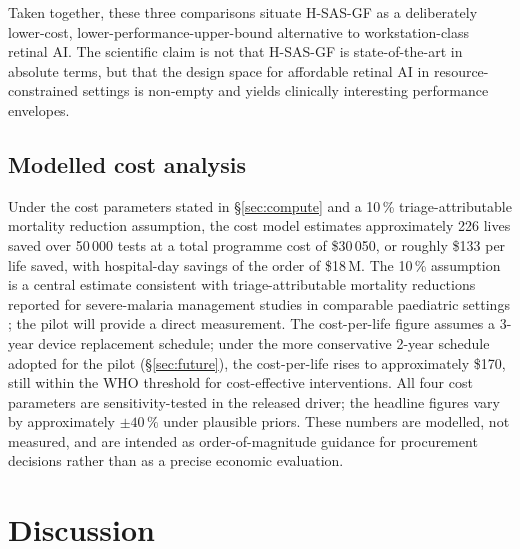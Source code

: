 \documentclass[twocolumn,10pt]{article}
\begin{document}
Taken together, these three comparisons situate H-SAS-GF as a
deliberately lower-cost, lower-performance-upper-bound alternative
to workstation-class retinal AI. The scientific claim is not that
H-SAS-GF is state-of-the-art in absolute terms, but that the
design space for affordable retinal AI in resource-constrained
settings is non-empty and yields clinically interesting
performance envelopes.

\subsection{Modelled cost analysis}
Under the cost parameters stated in \S\ref{sec:compute} and a
10\,\% triage-attributable mortality reduction assumption, the
cost model estimates approximately 226 lives saved over 50\,000
tests at a total programme cost of \$30\,050, or roughly \$133
per life saved, with hospital-day savings of the order of
\$18\,M. The 10\,\% assumption is a central estimate consistent
with triage-attributable mortality reductions reported for
severe-malaria management studies in comparable paediatric
settings \cite{Dondorp2010,WHO2023}; the pilot will provide a
direct measurement. The cost-per-life figure assumes a 3-year
device replacement schedule; under the more conservative 2-year
schedule adopted for the pilot (\S\ref{sec:future}), the
cost-per-life rises to approximately \$170, still within the WHO
threshold for cost-effective interventions. All four cost
parameters are sensitivity-tested in the released driver; the
headline figures vary by approximately $\pm 40\,\%$ under
plausible priors. These numbers are modelled, not measured, and
are intended as order-of-magnitude guidance for procurement
decisions rather than as a precise economic evaluation.

\section{Discussion}
\label{sec:discussion}
\end{document}
